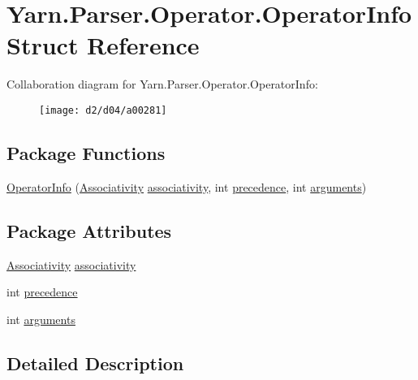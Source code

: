 \hypertarget{a00059}{\section{Yarn.\-Parser.\-Operator.\-Operator\-Info Struct Reference}
\label{a00059}
}


Collaboration diagram for Yarn.\-Parser.\-Operator.\-Operator\-Info\-:
\nopagebreak
\begin{figure}[H]
\begin{center}
\leavevmode
\texttt{[image: d2/d04/a00281]}
\end{center}
\end{figure}
\subsection*{Package Functions}
\begin{DoxyCompactItemize}
\item 
\hyperlink{a00059_a25faca62235c9f8542e4a071ba8ebc0b}{Operator\-Info} (\hyperlink{a00058_a83fa1b8db0e6678006920812b6f33f62}{Associativity} \hyperlink{a00059_accba40a72d9709ca3c18810b8661afe3}{associativity}, int \hyperlink{a00059_a0b2921d7b863e268d33aa15213395093}{precedence}, int \hyperlink{a00059_a0758c6f7dac4b205f616b43b1af95b95}{arguments})
\end{DoxyCompactItemize}
\subsection*{Package Attributes}
\begin{DoxyCompactItemize}
\item 
\hyperlink{a00058_a83fa1b8db0e6678006920812b6f33f62}{Associativity} \hyperlink{a00059_accba40a72d9709ca3c18810b8661afe3}{associativity}
\item 
int \hyperlink{a00059_a0b2921d7b863e268d33aa15213395093}{precedence}
\item 
int \hyperlink{a00059_a0758c6f7dac4b205f616b43b1af95b95}{arguments}
\end{DoxyCompactItemize}


\subsection{Detailed Description}


